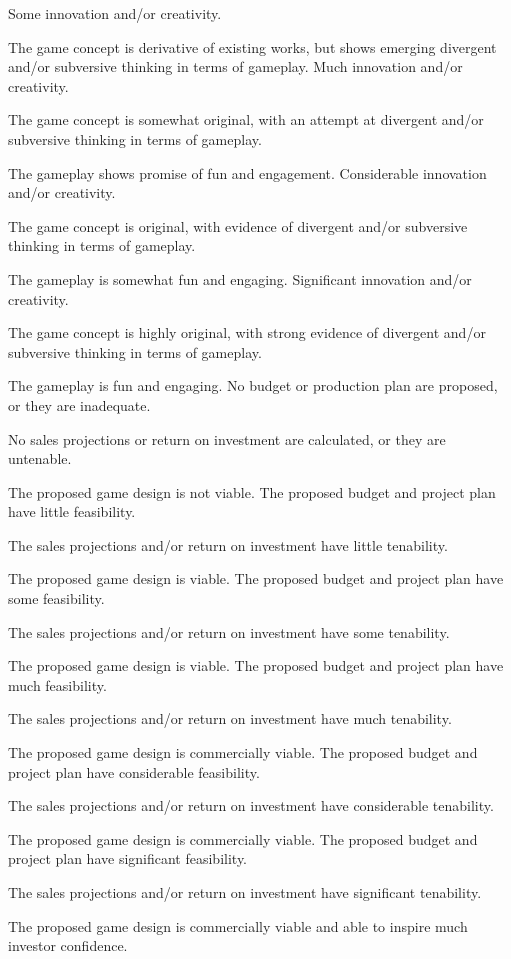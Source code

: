 \documentclass{../../fal_assignment}
\begin{document}
\begin{markingrubric}
        \grade Some innovation and/or creativity.
            \par The game concept is derivative of existing works, but shows emerging divergent and/or subversive thinking in terms of gameplay.
        \grade Much innovation and/or creativity.
            \par The game concept is somewhat original, with an attempt at divergent and/or subversive thinking in terms of gameplay.
            \par The gameplay shows promise of fun and engagement.
        \grade Considerable innovation and/or creativity.
            \par The game concept is original, with evidence of divergent and/or subversive thinking in terms of gameplay.
            \par The gameplay is somewhat fun and engaging.
        \grade Significant innovation and/or creativity.
            \par The game concept is highly original, with strong evidence of divergent and/or subversive thinking in terms of gameplay.
            \par The gameplay is fun and engaging.
%
        \grade\fail No budget or production plan are proposed, or they are inadequate.
            \par No sales projections or return on investment are calculated, or they are untenable.
            \par The proposed game design is not viable.
        \grade The proposed budget and project plan have little feasibility.
            \par The sales projections and/or return on investment have little tenability.
            \par The proposed game design is viable.
        \grade The proposed budget and project plan have some feasibility.
            \par The sales projections and/or return on investment have some tenability.
            \par The proposed game design is viable.
        \grade The proposed budget and project plan have much feasibility.
            \par The sales projections and/or return on investment have much tenability.
            \par The proposed game design is commercially viable.
        \grade The proposed budget and project plan have considerable feasibility.
            \par The sales projections and/or return on investment have considerable tenability.
            \par The proposed game design is commercially viable.
        \grade The proposed budget and project plan have significant feasibility.
            \par The sales projections and/or return on investment have significant tenability.
            \par The proposed game design is commercially viable and able to inspire much investor confidence.
\end{markingrubric}
\end{document}
